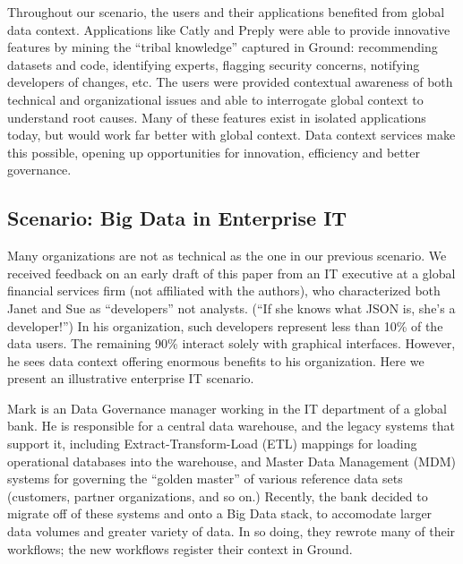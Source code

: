 \documentclass{cidr-2017}
\begin{document}
Throughout our scenario, the users and their applications benefited from global data context. 
Applications like Catly and Preply were able to provide innovative features by mining the ``tribal knowledge'' captured in Ground:
recommending datasets and code, identifying experts, flagging security concerns, notifying developers of changes, etc.
The users were provided contextual awareness of both technical and organizational issues and able to interrogate global context to understand root causes. 
Many of these features exist in isolated applications today, but would work far better with global context. 
Data context services make this possible, opening up opportunities for innovation, efficiency and better governance.

\subsection{Scenario: Big Data in Enterprise IT}
Many organizations are not as technical as the one in our previous scenario. We received feedback on an early draft of this paper from an IT executive at a global financial services firm (not affiliated with the authors), who characterized both Janet and Sue as ``developers'' not analysts. (``If she knows what JSON is, she's a developer!'') In his organization, such developers represent less than 10\% of the data users. The remaining 90\% interact solely with graphical interfaces. However, he sees data context offering enormous benefits to his organization. Here we present an illustrative enterprise IT scenario.

Mark is an Data Governance manager working in the IT department of a global bank. He is responsible for a central data warehouse, and the legacy systems that support it, including Extract-Transform-Load (ETL) mappings for loading operational databases into the warehouse, and Master Data Management (MDM) systems for governing the ``golden master'' of various reference data sets (customers, partner organizations, and so on.) Recently, the bank decided to migrate off of these systems and onto a Big Data stack, to accomodate larger data volumes and greater variety of data. In so doing, they rewrote many of their workflows; the new workflows register their context in Ground.
\end{document}

